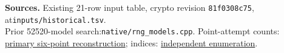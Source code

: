\documentclass[10pt]{article}
\begin{document}
\textbf{Sources.} Existing 21-row input table, crypto revision
\texttt{81f0308c75}, at\texttt{inputs/historical.tsv}.\\
Prior 52520-model search:\texttt{native/rng\_models.cpp}.
Point-attempt counts: \href{https://www.anthropic.com/research/ecdsa-curve-origins}{primary six-point reconstruction};
indices: \href{https://words.filippo.io/seeds-solved/}{independent enumeration}.
\end{document}
